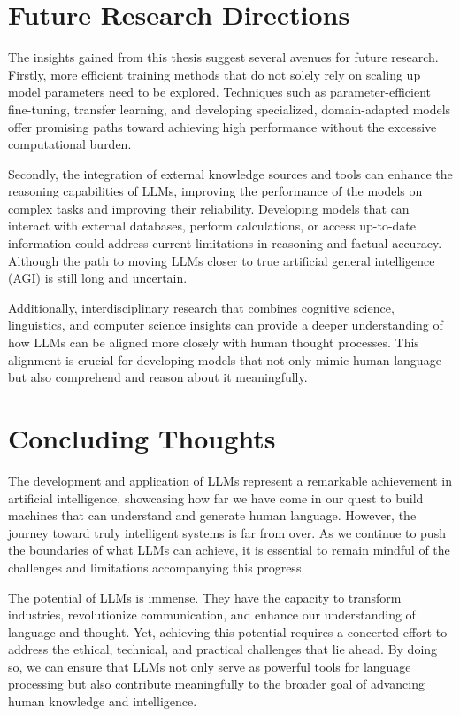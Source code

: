 \section*{Future Research Directions}
The insights gained from this thesis suggest several avenues for future research.
Firstly, more efficient training methods that do not solely rely on scaling up model parameters need to be explored.
Techniques such as parameter-efficient fine-tuning, transfer learning, and developing specialized, domain-adapted models offer promising paths toward achieving high performance without the excessive computational burden.

Secondly, the integration of external knowledge sources and tools can enhance the reasoning capabilities of LLMs, improving the performance of the models on complex tasks and improving their reliability.
Developing models that can interact with external databases, perform calculations, or access up-to-date information could address current limitations in reasoning and factual accuracy.
Although the path to moving LLMs closer to true artificial general intelligence (AGI) is still long and uncertain.

Additionally, interdisciplinary research that combines cognitive science, linguistics, and computer science insights can provide a deeper understanding of how LLMs can be aligned more closely with human thought processes.
This alignment is crucial for developing models that not only mimic human language but also comprehend and reason about it meaningfully.

\section*{Concluding Thoughts}
The development and application of LLMs represent a remarkable achievement in artificial intelligence, showcasing how far we have come in our quest to build machines that can understand and generate human language.
However, the journey toward truly intelligent systems is far from over.
As we continue to push the boundaries of what LLMs can achieve, it is essential to remain mindful of the challenges and limitations accompanying this progress.

The potential of LLMs is immense. They have the capacity to transform industries, revolutionize communication, and enhance our understanding of language and thought.
Yet, achieving this potential requires a concerted effort to address the ethical, technical, and practical challenges that lie ahead.
By doing so, we can ensure that LLMs not only serve as powerful tools for language processing but also contribute meaningfully to the broader goal of advancing human knowledge and intelligence.